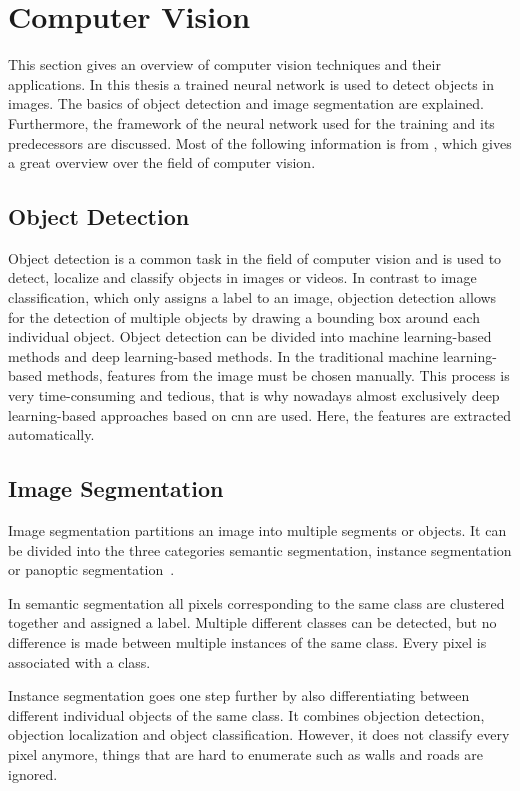 \section{Computer Vision}
\label{sec:computer_vision}
This section gives an overview of computer vision techniques and their applications.
In this thesis a trained neural network is used to detect objects in images.
The basics of object detection and image segmentation are explained.
Furthermore, the framework of the neural network used for the training and its predecessors are discussed.
Most of the following information is from \cite{Szeliski2022}, which gives a great overview over the field of computer vision.

\subsection{Object Detection}
Object detection is a common task in the field of computer vision and is used to detect, localize and classify objects in images or videos.
In contrast to image classification, which only assigns a label to an image, objection detection allows for the detection of multiple objects by drawing a bounding box around each individual object.
Object detection can be divided into machine learning-based methods and deep learning-based methods.
In the traditional machine learning-based methods, features from the image must be chosen manually.
This process is very time-consuming and tedious, that is why nowadays almost exclusively deep learning-based approaches based on \gls{cnn} are used.
Here, the features are extracted automatically.


\subsection{Image Segmentation}
Image segmentation partitions an image into multiple segments or objects.
It can be divided into the three categories semantic segmentation, instance segmentation or panoptic segmentation~\cite{Minaee2021}.

In semantic segmentation all pixels corresponding to the same class are clustered together and assigned a label.
Multiple different classes can be detected, but no difference is made between multiple instances of the same class.
Every pixel is associated with a class.

Instance segmentation goes one step further by also differentiating between different individual objects of the same class.
It combines objection detection, objection localization and object classification.
However, it does not classify every pixel anymore, things that are hard to enumerate such as walls and roads are ignored.

